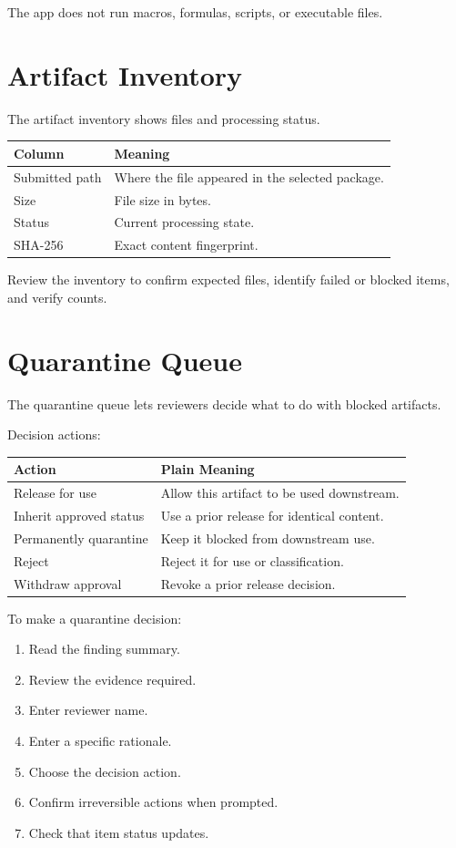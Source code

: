 The app does not run macros, formulas, scripts, or executable files.

\section{Artifact Inventory}

The artifact inventory shows files and processing status.

\begin{longtable}{L{0.30\textwidth}L{0.60\textwidth}}
\toprule
\textbf{Column} & \textbf{Meaning} \\
\midrule
Submitted path & Where the file appeared in the selected package. \\
Size & File size in bytes. \\
Status & Current processing state. \\
SHA-256 & Exact content fingerprint. \\
\bottomrule
\end{longtable}

Review the inventory to confirm expected files, identify failed or blocked items, and verify counts.

\section{Quarantine Queue}

The quarantine queue lets reviewers decide what to do with blocked artifacts.

Decision actions:

\begin{longtable}{L{0.30\textwidth}L{0.60\textwidth}}
\toprule
\textbf{Action} & \textbf{Plain Meaning} \\
\midrule
Release for use & Allow this artifact to be used downstream. \\
Inherit approved status & Use a prior release for identical content. \\
Permanently quarantine & Keep it blocked from downstream use. \\
Reject & Reject it for use or classification. \\
Withdraw approval & Revoke a prior release decision. \\
\bottomrule
\end{longtable}

To make a quarantine decision:

\begin{enumerate}
  \item Read the finding summary.
  \item Review the evidence required.
  \item Enter reviewer name.
  \item Enter a specific rationale.
  \item Choose the decision action.
  \item Confirm irreversible actions when prompted.
  \item Check that item status updates.
\end{enumerate}

